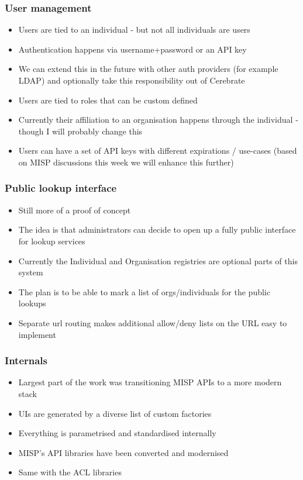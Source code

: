 \begin{frame}
	\frametitle{User management}
	\begin{itemize}
		\item Users are tied to an individual - but not all individuals are users
                \item Authentication happens via username+password or an API key
                \item We can extend this in the future with other auth providers (for example LDAP) and optionally take this responsibility out of Cerebrate
                \item Users are tied to roles that can be custom defined
                \item Currently their affiliation to an organisation happens through the individual - though I will probably change this
                \item Users can have a set of API keys with different expirations / use-cases (based on MISP discussions this week we will enhance this further)
	\end{itemize}
\end{frame}

\begin{frame}
	\frametitle{Public lookup interface}
	\begin{itemize}
		\item Still more of a proof of concept
                \item The idea is that administrators can decide to open up a fully public interface for lookup services
                \item Currently the Individual and Organisation registries are optional parts of this system
                \item The plan is to be able to mark a list of orgs/individuals for the public lookups
                \item Separate url routing makes additional allow/deny lists on the URL easy to implement
	\end{itemize}
\end{frame}

\begin{frame}
	\frametitle{Internals}
	\begin{itemize}
		\item Largest part of the work was transitioning MISP APIs to a more modern stack
                \item UIs are generated by a diverse list of custom factories
                \item Everything is parametrised and standardised internally
                \item MISP's API libraries have been converted and modernised
                \item Same with the ACL libraries
	\end{itemize}
\end{frame}

